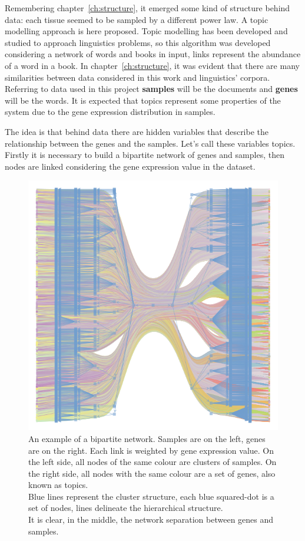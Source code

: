 Remembering chapter~\ref{ch:structure}, it emerged some kind of structure behind data: each tissue seemed to be sampled by a different power law. A topic modelling approach is here proposed. Topic modelling has been developed and studied to approach linguistics problems, so this algorithm was developed considering a network of words and books in input, links represent the abundance of a word in a book. In chapter~\ref{ch:structure}, it was evident that there are many similarities between data considered in this work and linguistics' corpora. Referring to data used in this project \textbf{samples} will be the documents and \textbf{genes} will be the words. It is expected that topics represent some properties of the system due to the gene expression distribution in samples.

The idea is that behind data there are hidden variables that describe the relationship between the genes and the samples. Let's call these variables topics.
Firstly it is necessary to build a bipartite network of genes and samples, then nodes are linked considering the gene expression value in the dataset.
\begin{figure}[htb!]
    \centering
    \includegraphics[width=0.7\linewidth]{pictures/topic/bipartite.pdf}
    \caption{An example of a bipartite network. Samples are on the left, genes are on the right. Each link is weighted by gene expression value. On the left side, all nodes of the same colour are clusters of samples. On the right side, all nodes with the same colour are a set of genes, also known as topics.\\
    Blue lines represent the cluster structure, each blue squared-dot is a set of nodes, lines delineate the hierarchical structure.\\
    It is clear, in the middle, the network separation between genes and samples.}
    \label{fig:topic/bipartite}
\end{figure}


